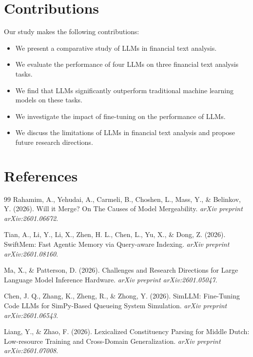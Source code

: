 \documentclass{article}
\begin{document}
\section{Contributions}
Our study makes the following contributions:

\begin{itemize}
\item We present a comparative study of LLMs in financial text analysis.
\item We evaluate the performance of four LLMs on three financial text analysis tasks.
\item We find that LLMs significantly outperform traditional machine learning models on these tasks.
\item We investigate the impact of fine-tuning on the performance of LLMs.
\item We discuss the limitations of LLMs in financial text analysis and propose future research directions.
\end{itemize}

\section{References}
\begin{thebibliography}{99}
 Rahamim, A., Yehudai, A., Carmeli, B., Choshen, L., Mass, Y., \& Belinkov, Y. (2026). Will it Merge? On The Causes of Model Mergeability. \textit{arXiv preprint arXiv:2601.06672}.

 Tian, A., Li, Y., Li, X., Zhen, H. L., Chen, L., Yu, X., \& Dong, Z. (2026). SwiftMem: Fast Agentic Memory via Query-aware Indexing. \textit{arXiv preprint arXiv:2601.08160}.

 Ma, X., \& Patterson, D. (2026). Challenges and Research Directions for Large Language Model Inference Hardware. \textit{arXiv preprint arXiv:2601.05047}.

 Chen, J. Q., Zhang, K., Zheng, R., \& Zhong, Y. (2026). SimLLM: Fine-Tuning Code LLMs for SimPy-Based Queueing System Simulation. \textit{arXiv preprint arXiv:2601.06543}.

 Liang, Y., \& Zhao, F. (2026). Lexicalized Constituency Parsing for Middle Dutch: Low-resource Training and Cross-Domain Generalization. \textit{arXiv preprint arXiv:2601.07008}.
\end{thebibliography}
\end{document}
